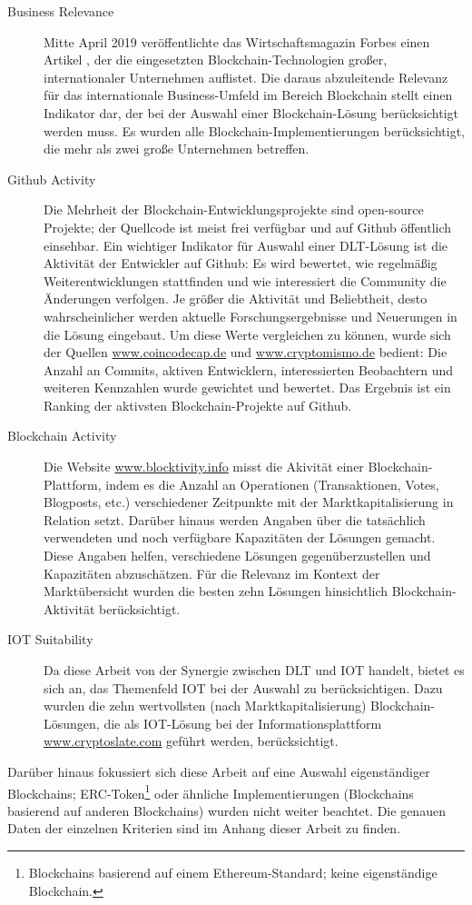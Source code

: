 \begin{description}
  \item[Business Relevance] Mitte April 2019 veröffentlichte das Wirtschaftsmagazin Forbes einen Artikel \cite{castillo2019}, der die eingesetzten Blockchain-Technologien großer, internationaler Unternehmen auflistet. Die daraus abzuleitende Relevanz für das internationale Business-Umfeld im Bereich Blockchain stellt einen Indikator dar, der bei der Auswahl einer Blockchain-Lösung berücksichtigt werden muss. Es wurden alle Blockchain-Implementierungen berücksichtigt, die mehr als zwei große Unternehmen betreffen.
  \item[Github Activity] Die Mehrheit der Blockchain-Entwicklungsprojekte sind open-source Projekte; der Quellcode ist meist frei verfügbar und auf Github öffentlich einsehbar. Ein wichtiger Indikator für Auswahl einer \ac{DLT}-Lösung ist die Aktivität der Entwickler auf Github: Es wird bewertet, wie regelmäßig Weiterentwicklungen stattfinden und wie interessiert die Community die Änderungen verfolgen. Je größer die Aktivität und Beliebtheit, desto wahrscheinlicher werden aktuelle Forschungsergebnisse und Neuerungen in die Lösung eingebaut. Um diese Werte vergleichen zu können, wurde sich der Quellen \url{www.coincodecap.de} und \url{www.cryptomismo.de} bedient: Die Anzahl an Commits, aktiven Entwicklern, interessierten Beobachtern und weiteren Kennzahlen wurde gewichtet und bewertet. Das Ergebnis ist ein Ranking der aktivsten Blockchain-Projekte auf Github.
  \item[Blockchain Activity] Die Website \url{www.blocktivity.info} misst die Akivität einer Blockchain-Plattform, indem es die Anzahl an Operationen (Transaktionen, Votes, Blogposts, etc.) verschiedener Zeitpunkte mit der Marktkapitalisierung in Relation setzt. Darüber hinaus werden Angaben über die tatsächlich verwendeten und noch verfügbare Kapazitäten der Lösungen gemacht. Diese Angaben helfen, verschiedene Lösungen gegenüberzustellen und Kapazitäten abzuschätzen. Für die Relevanz im Kontext der Marktübersicht wurden die besten zehn Lösungen hinsichtlich Blockchain-Aktivität berücksichtigt.
  \item[IOT Suitability] Da diese Arbeit von der Synergie zwischen \ac{DLT} und \ac{IOT} handelt, bietet es sich an, das Themenfeld \ac{IOT} bei der Auswahl zu berücksichtigen. Dazu wurden die zehn wertvollsten (nach Marktkapitalisierung) Blockchain-Lösungen, die als \ac{IOT}-Lösung bei der Informationsplattform \url{www.cryptoslate.com} geführt werden, berücksichtigt.
\end{description}
Darüber hinaus fokussiert sich diese Arbeit auf eine Auswahl eigenständiger Blockchains; ERC-Token\footnote{Blockchains basierend auf einem Ethereum-Standard; keine eigenständige Blockchain.} oder ähnliche Implementierungen (Blockchains basierend auf anderen Blockchains) wurden nicht weiter beachtet. Die genauen Daten der einzelnen Kriterien sind im Anhang dieser Arbeit zu finden.

